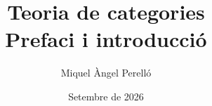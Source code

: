 \title{Teoria de categories\\[0.6em]
  \large Prefaci i introducció}
\author{Miquel Àngel Perelló}
\date{Setembre de 2026}

\newcommand{\hypermetadata}{%
  \hypersetup{%
    pdftitle={Teoria de categories — Prefaci i introducció},
    pdfauthor={Miquel Àngel Perelló}%
  }%
}